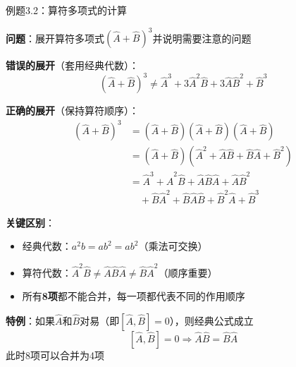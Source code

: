 \documentclass[aspectratio=169, 10pt]{beamer}
\begin{document}
\begin{frame}{例题3.2：算符多项式的计算}

  \textbf{问题}：展开算符多项式$(\hat{A}+\hat{B})^3$并说明需要注意的问题

  \iqbsep

  \begin{iqbitemize}
    \item \textbf{错误的展开}（套用经典代数）：
    \[
      (\hat{A}+\hat{B})^3 \neq \hat{A}^3 + 3\hat{A}^2\hat{B} + 3\hat{A}\hat{B}^2 + \hat{B}^3
    \]

    \item \textbf{正确的展开}（保持算符顺序）：
    \begin{align*}
      (\hat{A}+\hat{B})^3 &= (\hat{A}+\hat{B})(\hat{A}+\hat{B})(\hat{A}+\hat{B}) \\
      &= (\hat{A}+\hat{B})(\hat{A}^2 + \hat{A}\hat{B} + \hat{B}\hat{A} + \hat{B}^2) \\
      &= \hat{A}^3 + \hat{A}^2\hat{B} + \hat{A}\hat{B}\hat{A} + \hat{A}\hat{B}^2 \\
      &\quad + \hat{B}\hat{A}^2 + \hat{B}\hat{A}\hat{B} + \hat{B}^2\hat{A} + \hat{B}^3
    \end{align*}

    \item \textbf{关键区别}：
    \begin{itemize}
      \setlength{\itemsep}{0.05cm}
      \item 经典代数：$a^2b = ab^2 = ab^2$（乘法可交换）
      \item 算符代数：$\hat{A}^2\hat{B} \neq \hat{A}\hat{B}\hat{A} \neq \hat{B}\hat{A}^2$（顺序重要）
      \item 所有\textbf{8项}都不能合并，每一项都代表不同的作用顺序
    \end{itemize}

    \item \textbf{特例}：如果$\hat{A}$和$\hat{B}$对易（即$[\hat{A},\hat{B}]=0$），则经典公式成立
    \[
      [\hat{A},\hat{B}]=0 \Rightarrow \hat{A}\hat{B} = \hat{B}\hat{A}
    \]
    此时8项可以合并为4项
  \end{iqbitemize}

\end{frame}

\end{document}
